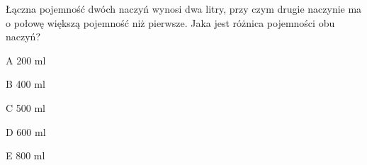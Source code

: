 \begin{tresc}
Łączna pojemność dwóch naczyń wynosi dwa litry, przy czym drugie naczynie ma o połowę większą pojemność niż pierwsze. Jaka jest różnica pojemności obu naczyń?
\end{tresc}
\begin{wariant}{A} 200 ml \end{wariant}
\begin{wariant}{B} 400 ml \end{wariant}
\begin{wariant}{C} 500 ml \end{wariant}
\begin{wariant}{D} 600 ml \end{wariant}
\begin{wariant}{E} 800 ml \end{wariant}
